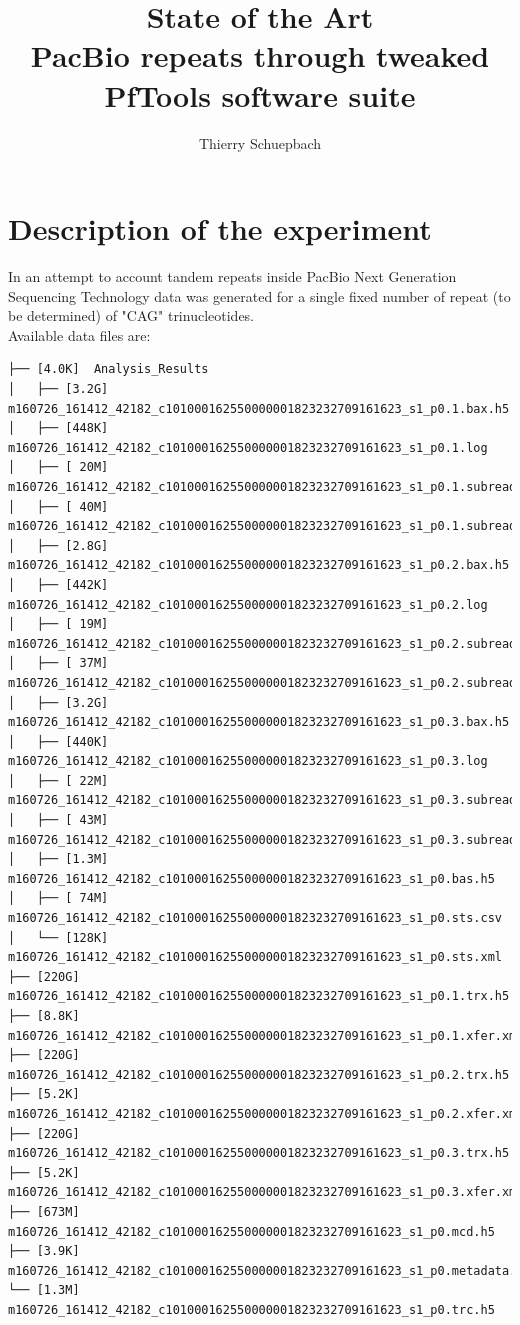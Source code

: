 \documentclass[notitlepage,a4paper]{article}\usepackage[]{graphicx}\usepackage[]{color}
\title{State of the Art\\ PacBio repeats through tweaked PfTools software suite}
\author{Thierry Schuepbach}
\begin{document}
\maketitle
\tableofcontents

\section{Description of the experiment}
In an attempt to account tandem repeats inside PacBio Next Generation Sequencing Technology data was generated for a single fixed number of repeat (to be determined) of "CAG" trinucleotides.\\
Available data files are:
\small{
\begin{verbatim}
├── [4.0K]  Analysis_Results
│   ├── [3.2G]  m160726_161412_42182_c101000162550000001823232709161623_s1_p0.1.bax.h5
│   ├── [448K]  m160726_161412_42182_c101000162550000001823232709161623_s1_p0.1.log
│   ├── [ 20M]  m160726_161412_42182_c101000162550000001823232709161623_s1_p0.1.subreads.fasta
│   ├── [ 40M]  m160726_161412_42182_c101000162550000001823232709161623_s1_p0.1.subreads.fastq
│   ├── [2.8G]  m160726_161412_42182_c101000162550000001823232709161623_s1_p0.2.bax.h5
│   ├── [442K]  m160726_161412_42182_c101000162550000001823232709161623_s1_p0.2.log
│   ├── [ 19M]  m160726_161412_42182_c101000162550000001823232709161623_s1_p0.2.subreads.fasta
│   ├── [ 37M]  m160726_161412_42182_c101000162550000001823232709161623_s1_p0.2.subreads.fastq
│   ├── [3.2G]  m160726_161412_42182_c101000162550000001823232709161623_s1_p0.3.bax.h5
│   ├── [440K]  m160726_161412_42182_c101000162550000001823232709161623_s1_p0.3.log
│   ├── [ 22M]  m160726_161412_42182_c101000162550000001823232709161623_s1_p0.3.subreads.fasta
│   ├── [ 43M]  m160726_161412_42182_c101000162550000001823232709161623_s1_p0.3.subreads.fastq
│   ├── [1.3M]  m160726_161412_42182_c101000162550000001823232709161623_s1_p0.bas.h5
│   ├── [ 74M]  m160726_161412_42182_c101000162550000001823232709161623_s1_p0.sts.csv
│   └── [128K]  m160726_161412_42182_c101000162550000001823232709161623_s1_p0.sts.xml
├── [220G]  m160726_161412_42182_c101000162550000001823232709161623_s1_p0.1.trx.h5
├── [8.8K]  m160726_161412_42182_c101000162550000001823232709161623_s1_p0.1.xfer.xml
├── [220G]  m160726_161412_42182_c101000162550000001823232709161623_s1_p0.2.trx.h5
├── [5.2K]  m160726_161412_42182_c101000162550000001823232709161623_s1_p0.2.xfer.xml
├── [220G]  m160726_161412_42182_c101000162550000001823232709161623_s1_p0.3.trx.h5
├── [5.2K]  m160726_161412_42182_c101000162550000001823232709161623_s1_p0.3.xfer.xml
├── [673M]  m160726_161412_42182_c101000162550000001823232709161623_s1_p0.mcd.h5
├── [3.9K]  m160726_161412_42182_c101000162550000001823232709161623_s1_p0.metadata.xml
└── [1.3M]  m160726_161412_42182_c101000162550000001823232709161623_s1_p0.trc.h5
\end{verbatim}
}
\end{document}
